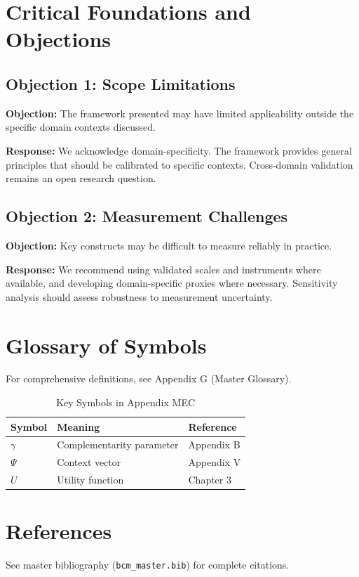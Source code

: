
\section{Critical Foundations and Objections}
\label{sec:mec-foundations}

\subsection{Objection 1: Scope Limitations}

\textbf{Objection:} The framework presented may have limited applicability
outside the specific domain contexts discussed.

\textbf{Response:} We acknowledge domain-specificity. The framework provides
general principles that should be calibrated to specific contexts. Cross-domain
validation remains an open research question.

\subsection{Objection 2: Measurement Challenges}

\textbf{Objection:} Key constructs may be difficult to measure reliably in
practice.

\textbf{Response:} We recommend using validated scales and instruments where
available, and developing domain-specific proxies where necessary. Sensitivity
analysis should assess robustness to measurement uncertainty.



\section{Glossary of Symbols}
\label{sec:mec-glossary}

For comprehensive definitions, see Appendix G (Master Glossary).

\begin{table}[htbp]
\centering
\caption{Key Symbols in Appendix MEC}
\begin{tabular}{lll}
\toprule
\textbf{Symbol} & \textbf{Meaning} & \textbf{Reference} \\
\midrule
$\gamma$ & Complementarity parameter & Appendix B \\
$\Psi$ & Context vector & Appendix V \\
$U$ & Utility function & Chapter 3 \\
\bottomrule
\end{tabular}
\end{table}


\section{References}
\label{sec:mec-references}

See master bibliography (\texttt{bcm\_master.bib}) for complete citations.

\nocite{bcm_master}

